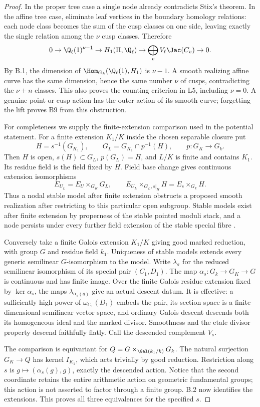 \begin{proof}
In the proper tree case a single node already contradicts Stix's theorem.
In the affine tree case, eliminate leaf vertices in the boundary homology
relations: each node class becomes the sum of the cusp classes on one side,
leaving exactly the single relation among the $\nu$ cusp classes. Therefore
\[
 0\to\Q_\ell(1)^{\nu-1}\to H_1(\Pi,\Q_\ell)
 \to\bigoplus_v V_\ell\Jac(C_v)\to0.
\]
By B.1, the dimension of $\Hom_{G_k}(\Q_\ell(1),H_1)$ is $\nu-1$.
A smooth realizing affine curve has the same dimension, hence the same
number $\nu$ of cusps, contradicting the $\nu+n$ classes. This also proves
the counting criterion in L5, including $\nu=0$. A genuine point or cusp
action has the outer action of its smooth curve; forgetting the lift proves
B9 from this obstruction.

For completeness we supply the finite-extension comparison used in the
potential statement. For a finite extension $K_1/K$ inside the chosen
separable closure put
\[
 H=s^{-1}(G_{K_1}),\qquad G_L=G_{K_1}\cap p^{-1}(H),
 \qquad p:G_K\to G_k.
\]
Then $H$ is open, $s(H)\subset G_L$, $p(G_L)=H$, and $L/K$ is finite and
contains $K_1$. Its residue field is the field fixed by $H$. Field base
change gives continuous extension isomorphisms
\[
 E_{U_L}=E_U\times_{G_K}G_L,\qquad
 E_{U_L}\times_{G_L,s|_H}H=E_s\times_{G_k}H.
\]
Thus a nodal stable model after finite extension obstructs a proposed smooth
realization after restricting to this particular open subgroup. Stable
models exist after finite extension by properness of the stable pointed
moduli stack, and a node persists under every further field extension of
the stable special fibre \citep[Theorem 2.7]{BC_Knudsen}.

Conversely take a finite Galois extension $K_1/K$ giving good marked
reduction, with group $G$ and residue field $k_1$. Uniqueness of stable
models extends every generic semilinear $G$-isomorphism to the model.
Write $\lambda_\sigma$ for the reduced semilinear isomorphism of its special
pair $(C_1,D_1)$. The map $\alpha_s:G_k\to G_K\to G$ is continuous and
has finite image. Over the finite Galois residue extension fixed by
$\ker\alpha_s$, the maps $\lambda_{\alpha_s(g)}$ give an actual descent
datum. It is effective: a sufficiently high power of
$\omega_{C_1}(D_1)$ embeds the pair, its section space is a finite-dimensional
semilinear vector space, and ordinary Galois descent descends both its
homogeneous ideal and the marked divisor. Smoothness and the etale divisor
property descend faithfully flatly. Call the descended complement $V_s$.

The comparison is equivariant for
$Q=G\times_{\Gal(k_1/k)}G_k$. The natural surjection $G_K\to Q$ has kernel
$I_{K_1}$, which acts trivially by good reduction. Restriction along $s$ is
$g\mapsto(\alpha_s(g),g)$, exactly the descended action. Notice that the
second coordinate retains the entire arithmetic action on geometric
fundamental groups; this action is not asserted to factor through a finite
group. B.2 now identifies the extensions. This proves all three
equivalences for the specified $s$.
\end{proof}

